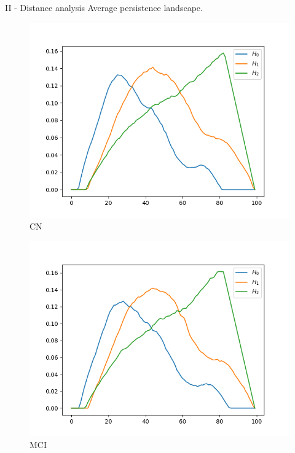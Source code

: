 \documentclass[aspectratio=169, 10pt, dvipsnames]{beamer}
\begin{document}
\begin{frame}[fragile]{II - Distance analysis}
  Average persistence landscape.\\
  \begin{figure}
    \centering
    \includegraphics[width=\textwidth]{figures/median_pls/median_pl_CN.png}
    \caption{CN}
  \end{figure}
  \endminipage
  \hfill
  \begin{figure}
    \centering
    \includegraphics[width=\textwidth]{figures/median_pls/median_pl_MCI.png}
    \caption{MCI}
  \end{figure}%
  \endminipage
  \hfill

\end{frame}
\end{document}
